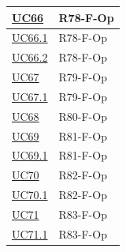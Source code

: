 \begin{longtable}{|p{2.8cm}|p{10.2cm}|}
	\hyperlink{uc66}{UC66}   & R78-F-Op \\ \hline
	\hyperlink{uc66.1}{UC66.1} & R78-F-Op \\ \hline
	\hyperlink{uc66.2}{UC66.2} & R78-F-Op \\ \hline
	\hyperlink{uc67}{UC67}   & R79-F-Op \\ \hline
	\hyperlink{uc67.1}{UC67.1} & R79-F-Op \\ \hline
	\hyperlink{uc68}{UC68}   & R80-F-Op \\ \hline
	\hyperlink{uc69}{UC69}   & R81-F-Op \\ \hline
	\hyperlink{uc69.1}{UC69.1} & R81-F-Op \\ \hline
	\hyperlink{uc70}{UC70}   & R82-F-Op \\ \hline
	\hyperlink{uc70.1}{UC70.1} & R82-F-Op \\ \hline
	\hyperlink{uc71}{UC71}   & R83-F-Op \\ \hline
	\hyperlink{uc71.1}{UC71.1} & R83-F-Op \\ \hline

\end{longtable}


